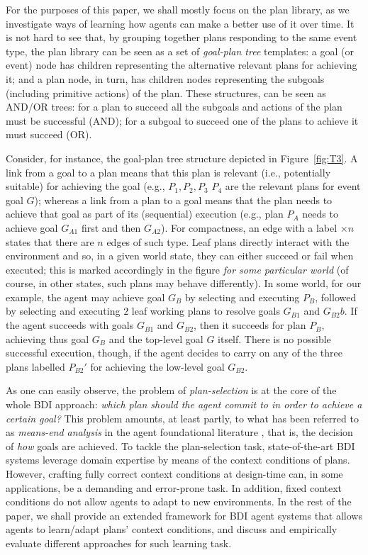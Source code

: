For the purposes of this paper, we shall mostly focus on the plan library, as we
investigate ways of learning how agents can make a better use of it over time.
It is not hard to see that, by grouping together plans responding to the same
event type, the plan library can be seen as a set of \emph{goal-plan tree}
templates: a goal (or event) node has children representing the alternative
relevant plans for achieving it; and a plan node, in turn, has children nodes
representing the subgoals (including primitive actions) of the plan.
These structures, can be seen as AND/OR trees: for a plan to succeed all the
subgoals and actions of the plan must be successful (AND); for a subgoal to
succeed one of the plans to achieve it must succeed (OR).

Consider, for instance, the goal-plan tree structure depicted in
Figure~\ref{fig:T3}.
A link from a goal to a plan means that this plan is relevant (i.e., potentially
suitable) for achieving the goal (e.g., $P_1,P_2,P_3$ $P_4$ are the relevant
plans for event goal $G$); whereas a link from a plan to a goal means that the
plan needs to achieve that goal as part of its (sequential) execution (e.g., plan
$P_A$ needs to achieve goal $G_{A1}$ first and then $G_{A2}$).
For compactness, an edge with a label $\times n$ states that there are $n$ edges
of such type.
Leaf plans directly interact with the environment and so, in a given world state,
they can either succeed or fail when executed; this is marked accordingly in the
figure \emph{for some particular world} (of course, in other states, such plans
may behave differently).
In some world, for our example, the agent may achieve goal $G_B$ by selecting and
executing $P_B$, followed by selecting and executing $2$ leaf working plans to
resolve goals $G_{B1}$ and $G_{B2}b$. If the agent succeeds with goals $G_{B1}$
and $G_{B2}$, then it succeeds for plan $P_B$, achieving thus goal $G_B$ and the
top-level goal $G$ itself. There is no possible successful execution, though, if
the agent decides to carry on any of the three plans labelled $P_{B2}'$ for
achieving the low-level goal $G_{B2}$.

As one can easily observe, the problem of \textit{plan-selection} is at the core
of the whole BDI approach:
\emph{which plan should the agent commit to in order to achieve a certain goal?}
This problem amounts, at least partly, to what has been referred to as
\emph{means-end analysis} in the agent foundational literature
\cite{Pollack92-IRMA,Bratman88}, that is, the decision of \textit{how} goals are
achieved.
To tackle the plan-selection task, state-of-the-art BDI systems leverage domain
expertise by means of the context conditions of plans. However, crafting fully
correct context conditions at design-time can, in some applications, be a
demanding and error-prone task. In addition, fixed context conditions do not
allow agents to adapt to new environments.
In the rest of the paper, we shall provide an extended framework for BDI agent
systems that allows agents to learn/adapt plans' context conditions, and discuss
and empirically evaluate different approaches for such learning task.


